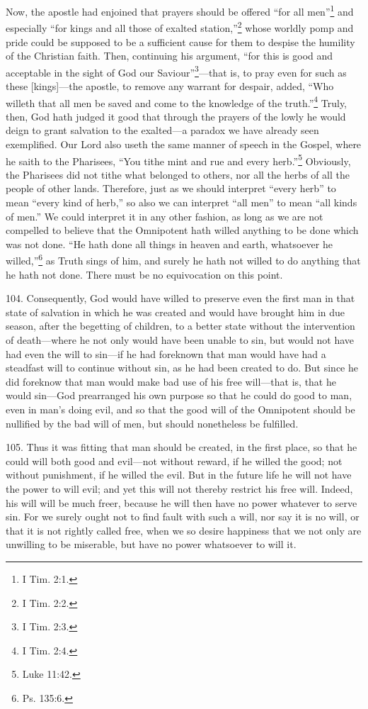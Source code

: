 Now, the apostle had enjoined that prayers should be offered ``for all men''\footnote{I Tim. 2:1.} and especially ``for kings and all those of exalted station,''\footnote{I Tim. 2:2.} whose worldly pomp and pride could be supposed to be a sufficient cause for them to despise the humility of the Christian faith. Then, continuing his argument, ``for this is good and acceptable in the sight of God our Saviour''\footnote{I Tim. 2:3.}—that is, to pray even for such as these [kings]—the apostle, to remove any warrant for despair, added, ``Who willeth that all men be saved and come to the knowledge of the truth.''\footnote{I Tim. 2:4.} Truly, then, God hath judged it good that through the prayers of the lowly he would deign to grant salvation to the exalted—a paradox we have already seen exemplified. Our Lord also useth the same manner of speech in the Gospel, where he saith to the Pharisees, ``You tithe mint and rue and every herb.''\footnote{Luke 11:42.} Obviously, the Pharisees did not tithe what belonged to others, nor all the herbs of all the people of other lands. Therefore, just as we should interpret ``every herb'' to mean ``every kind of herb,'' so also we can interpret ``all men'' to mean ``all kinds of men.'' We could interpret it in any other fashion, as long as we are not compelled to believe that the Omnipotent hath willed anything to be done which was not done. ``He hath done all things in heaven and earth, whatsoever he willed,''\footnote{Ps. 135:6.} as Truth sings of him, and surely he hath not willed to do anything that he hath not done. There must be no equivocation on this point.


104. Consequently, God would have willed to preserve even the first man in that state of salvation in which he was created and would have brought him in due season, after the begetting of children, to a better state without the intervention of death—where he not only would have been unable to sin, but would not have had even the will to sin—if he had foreknown that man would have had a steadfast will to continue without sin, as he had been created to do. But since he did foreknow that man would make bad use of his free will—that is, that he would sin—God prearranged his own purpose so that he could do good to man, even in man's doing evil, and so that the good will of the Omnipotent should be nullified by the bad will of men, but should nonetheless be fulfilled.

105. Thus it was fitting that man should be created, in the first place, so that he could will both good and evil—not without reward, if he willed the good; not without punishment, if he willed the evil. But in the future life he will not have the power to will evil; and yet this will not thereby restrict his free will. Indeed, his will will be much freer, because he will then have no power whatever to serve sin. For we surely ought not to find fault with such a will, nor say it is no will, or that it is not rightly called free, when we so desire happiness that we not only are unwilling to be miserable, but have no power whatsoever to will it.

